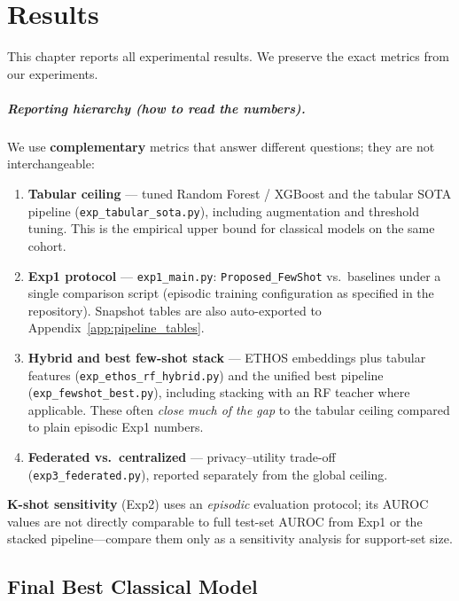 \chapter{Results}
\label{ch:results}

This chapter reports all experimental results. We preserve the exact metrics from our experiments.

\paragraph{Reporting hierarchy (how to read the numbers).}
We use \textbf{complementary} metrics that answer different questions; they are not interchangeable:
\begin{enumerate}[leftmargin=2em]
  \item \textbf{Tabular ceiling} --- tuned Random Forest / XGBoost and the tabular SOTA pipeline (\texttt{exp\_tabular\_sota.py}), including augmentation and threshold tuning. This is the empirical upper bound for classical models on the same cohort.
  \item \textbf{Exp1 protocol} --- \texttt{exp1\_main.py}: \texttt{Proposed\_FewShot} vs.\ baselines under a single comparison script (episodic training configuration as specified in the repository). Snapshot tables are also auto-exported to Appendix~\ref{app:pipeline_tables}.
  \item \textbf{Hybrid and best few-shot stack} --- ETHOS embeddings plus tabular features (\texttt{exp\_ethos\_rf\_hybrid.py}) and the unified best pipeline (\texttt{exp\_fewshot\_best.py}), including stacking with an RF teacher where applicable. These often \emph{close much of the gap} to the tabular ceiling compared to plain episodic Exp1 numbers.
  \item \textbf{Federated vs.\ centralized} --- privacy--utility trade-off (\texttt{exp3\_federated.py}), reported separately from the global ceiling.
\end{enumerate}
\textbf{K-shot sensitivity} (Exp2) uses an \emph{episodic} evaluation protocol; its AUROC values are not directly comparable to full test-set AUROC from Exp1 or the stacked pipeline---compare them only as a sensitivity analysis for support-set size.

\section{Final Best Classical Model}

